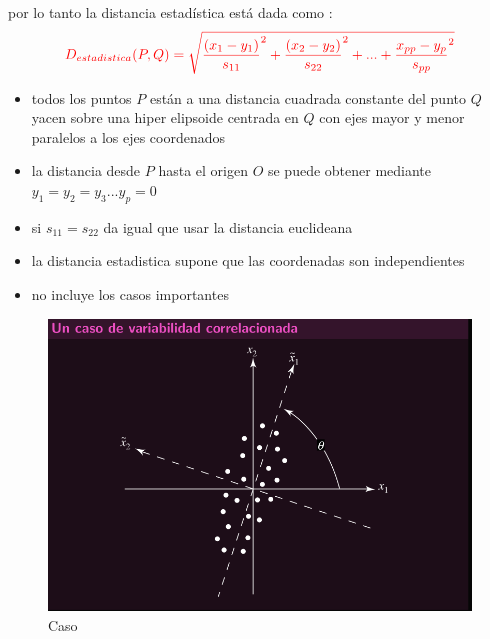\documentclass[10pt,a4paper]{article} %
\begin{document}
        por lo tanto la distancia estadística está dada como :
        \begin{equation}
            \color{red}D_{estadistica}(P,Q) = \sqrt{ \frac{(x_1 - y_1)}{s_{11}} ^{2} +
            \frac{(x_2 -
            y_2)}{s_{22}} ^{2} + ... + \frac{x_{pp}- y_p }{s_{pp}} ^{2} }
            \color{white}
        \end{equation}
        \begin{itemize}
            \item {todos los puntos $ P  $ están a una distancia cuadrada
                constante del punto $ Q  $ yacen sobre una hiper elipsoide
            centrada en $ Q  $  con ejes mayor y menor paralelos a los ejes
            coordenados}
            \item {la distancia desde $ P  $ hasta el origen $ O  $ se puede
                obtener mediante $ y_1 = y_2 = y_3 ... y_p = 0  $ }
            \item {si $ s_{11} = s_{22}   $ da igual que usar la distancia
                euclideana}
            \item {la distancia estadistica supone que las coordenadas son
                independientes}
            \item {no incluye los casos importantes}

        \newpage
        \end{itemize}
        \begin{figure}[h!]
            \centering
            \includegraphics[width=0.8\linewidth]{caso.png}
            \caption{Caso}
            \label{fig:caso}

        \end{figure}
\end{document}
